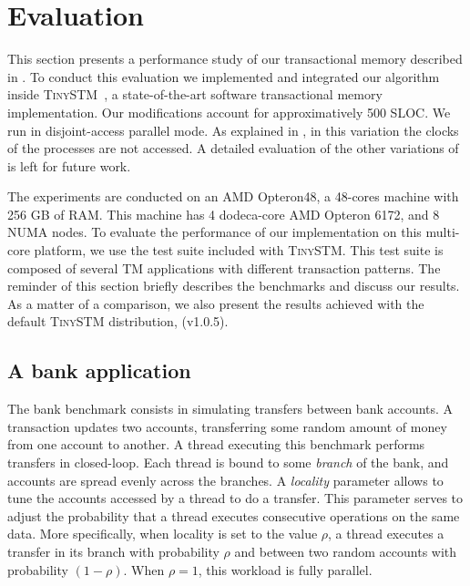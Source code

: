 \section{Evaluation}

This section presents a performance study of our \SPSER transactional memory described in .
To conduct this evaluation we implemented and integrated our algorithm inside \textsc{TinySTM}~\cite{FelberFMR10}, a state-of-the-art software transactional memory implementation.
Our modifications account for approximatively 500 SLOC.
We run  in disjoint-access parallel mode.
As explained in , in this variation the clocks of the processes are not accessed.
A detailed evaluation of the other variations of  is left for future work.

The experiments are conducted on an AMD Opteron48, a 48-cores machine with 256 GB of RAM. 
This machine has 4 dodeca-core AMD Opteron 6172, and 8 NUMA nodes.
To evaluate the performance of our implementation on this multi-core platform, we use the test suite included with \textsc{TinySTM}.
This test suite is composed of several TM applications with different transaction patterns.
The reminder of this section briefly describes the benchmarks and discuss our results.
As a matter of a comparison, we also present the results achieved with the default \textsc{TinySTM} distribution, (v1.0.5).
 
\subsection{A bank application}

The bank benchmark consists in simulating transfers between bank accounts.
A transaction updates two accounts, transferring some random amount of money from one account to another.
A thread executing this benchmark performs transfers in closed-loop.
Each thread is bound to some \emph{branch} of the bank, and accounts are spread evenly across the branches.
A \emph{locality} parameter allows to tune the accounts accessed by a thread to do a transfer.
This parameter serves to adjust the probability that a thread executes consecutive operations on the same data.
More specifically, when locality is set to the value $\rho$, a thread executes a transfer in its branch with probability $\rho$ and between two random accounts with probability $(1-\rho)$.
When $\rho=1$, this workload is fully parallel.

